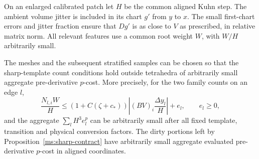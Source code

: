 On an enlarged calibrated patch let $H$ be the common aligned Kuhn
step.  The ambient volume jitter is included in its chart $g'$ from
$y$ to $x$.  The small first-chart errors and jitter fraction ensure
that $Dg'$ is as close to $V$ as prescribed, in relative matrix norm.
All relevant features use a common root weight $W$, with $W/H$
arbitrarily small.

\begin{lemma}\label{ha:sharp-counts}
The meshes and the subsequent stratified samples can be chosen so
that the sharp-template count conditions hold outside tetrahedra
of arbitrarily small aggregate pre-derivative $p$-cost.  More
precisely, for the two family counts on an edge $l$,
\begin{equation}\label{ha:sharp-edge}
 \frac{N_{l,i}W}{H}
 \le (1+C(\zeta+c_*))
          \left|(BV)_i\frac{\Delta y_l}{H}\right|+e_l,
 \qquad e_l\ge0,
\end{equation}
and the aggregate $\sum_lH^3e_l^p$ can be arbitrarily small after all
fixed template, transition and physical conversion factors.
The dirty portions left by Proposition~\ref{ms:sharp-contract} have
arbitrarily small aggregate evaluated pre-derivative $p$-cost in
aligned coordinates.
\end{lemma}

